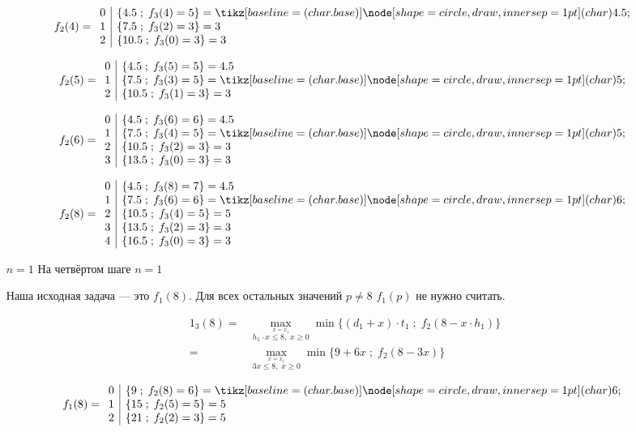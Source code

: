 \begin{enumerate}
	\[
		f_2(4) = \begin{array}{c|l}
			0 & \{4.5 \; ; \; f_3(4) = 5\} = \circled{4.5} \\
			1 & \{7.5 \; ; \; f_3(2) = 3\} = 3 \\
			2 & \{10.5 \; ; \; f_3(0) = 3\} = 3
		\end{array}
	\]
	
	\[
		f_2(5) = \begin{array}{c|l}
			0 & \{4.5 \; ; \; f_3(5) = 5\} = 4.5 \\
			1 & \{7.5 \; ; \; f_3(3) = 5\} = \circled{5} \\
			2 & \{10.5 \; ; \; f_3(1) = 3\} = 3
		\end{array}
	\]
	
	\[
		f_2(6) = \begin{array}{c|l}
			0 & \{4.5 \; ; \; f_3(6) = 6\} = 4.5 \\
			1 & \{7.5 \; ; \; f_3(4) = 5\} = \circled{5} \\
			2 & \{10.5 \; ; \; f_3(2) = 3\} = 3 \\
			3 & \{13.5 \; ; \; f_3(0) = 3\} = 3
		\end{array}
	\]
	
	\[
		f_2(8) = \begin{array}{c|l}
			0 & \{4.5 \; ; \; f_3(8) = 7\} = 4.5 \\
			1 & \{7.5 \; ; \; f_3(6) = 6\} = \circled{6} \\
			2 & \{10.5 \; ; \; f_3(4) = 5\} = 5 \\
			3 & \{13.5 \; ; \; f_3(2) = 3\} = 3 \\
			4 & \{16.5 \; ; \; f_3(0) = 3\} = 3
		\end{array}
	\]
	
	\item[$\boxed{n = 1}$] На четвёртом шаге $n = 1$
	
	Наша исходная задача --- это $f_1(8)$. Для всех остальных значений $p \neq 8$ $f_1(p)$ не нужно считать.
	
	\begin{align*}
		1_3(8) =& \max_{\stackrel{x = x_1}{h_1 \cdot x \le 8, \; x \ge 0}} \min\Big\{(d_1 + x) \cdot t_1 \; ; \; f_{2}(8 - x \cdot h_1)\Big\} \\
		=& \max_{\stackrel{x = x_1}{3x \le 8, \; x \ge 0}} \min\Big\{9 + 6x \; ; \; f_{2}(8 - 3x)\Big\}
	\end{align*}
	
	\[
		f_1(8) = \begin{array}{c|l}
			0 & \{9 \; ; \; f_2(8) = 6\} = \circled{6} \\
			1 & \{15 \; ; \; f_2(5) = 5\} = 5 \\
			2 & \{21 \; ; \; f_2(2) = 3\} = 5
		\end{array}
	\]
	

\end{enumerate}
